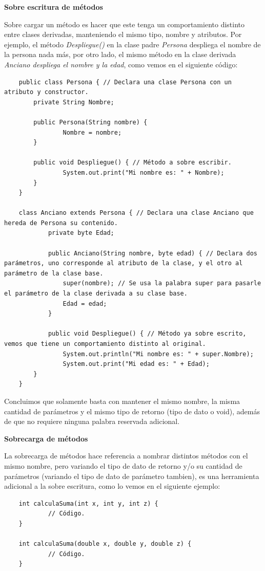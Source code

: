 \textbf{Sobre escritura de métodos}

Sobre cargar un método es hacer que este tenga un comportamiento distinto entre clases derivadas, manteniendo el mismo tipo, nombre y atributos. Por ejemplo, el método \textit{Despliegue()} en la clase padre \textit{Persona} despliega el nombre de la persona nada más, por otro lado, el mismo método en la clase derivada \textit{Anciano despliega el nombre y la edad}, como vemos en el siguiente código:
\begin{lstlisting}
    public class Persona { // Declara una clase Persona con un atributo y constructor.
        private String Nombre;
        
        public Persona(String nombre) {
        		Nombre = nombre;
        }
        
        public void Despliegue() { // Método a sobre escribir.
        		System.out.print("Mi nombre es: " + Nombre);
        }
    }
    
    class Anciano extends Persona { // Declara una clase Anciano que hereda de Persona su contenido.
    		private byte Edad;
    		
    		public Anciano(String nombre, byte edad) { // Declara dos parámetros, uno corresponde al atributo de la clase, y el otro al parámetro de la clase base.
    			super(nombre); // Se usa la palabra super para pasarle el parámetro de la clase derivada a su clase base.
    			Edad = edad;
    		}
    		
    		public void Despliegue() { // Método ya sobre escrito, vemos que tiene un comportamiento distinto al original.
        		System.out.println("Mi nombre es: " + super.Nombre);
        		System.out.print("Mi edad es: " + Edad);
        }
    }
\end{lstlisting}

Concluimos que solamente basta con mantener el mismo nombre, la misma cantidad de parámetros y el mismo tipo de retorno (tipo de dato o void), además de que no requiere ninguna palabra reservada adicional.

\textbf{Sobrecarga de métodos}

La sobrecarga de métodos hace referencia a nombrar distintos métodos con el mismo nombre, pero variando el tipo de dato de retorno y/o su cantidad de parámetros (variando el tipo de dato de parámetro tambien), es una herramienta adicional a la sobre escritura, como lo vemos en el siguiente ejemplo:
\begin{lstlisting}
	int calculaSuma(int x, int y, int z) {
    		// Código.
	}

	int calculaSuma(double x, double y, double z) {
    		// Código.
	}
\end{lstlisting}


